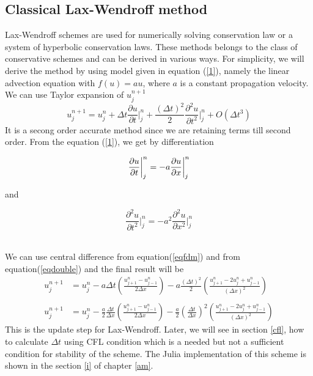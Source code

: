 \subsection{Classical Lax-Wendroff method}
Lax-Wendroff schemes are used for numerically solving conservation law or a system of hyperbolic conservation laws. These methods belongs to the class of conservative schemes and can be derived in various ways. For simplicity, we will derive the method by using model given in equation (\ref{1}), namely the linear advection equation with $f(u)=au$, where $a$ is a constant propagation velocity. We can use Taylor expansion of $u_j^{n+1}$
\begin{equation*}
    u_j^{n+1} = u_j^n + \Delta t \frac{\partial u}{\partial t}\bigg\vert_j^n + \frac{(\Delta t)^2}{2} \frac{\partial^2 u}{\partial t^2}\bigg\vert_j^n + O(\Delta t^3)
\end{equation*}
It is a secong order accurate method since we are retaining terms till second order. From the equation (\ref{1}), we get by differentiation\\
\begin{minipage}{0.5\textwidth}
\begin{equation*}
    \frac{\partial u}{\partial t}\bigg \vert_j^n = -a\frac{\partial u}{\partial x}\bigg \vert_j^n \\
\end{equation*}
\end{minipage} \hspace{-40pt} and \hspace{-40pt}
\begin{minipage}{0.5\textwidth}
\begin{equation*}
    \frac{\partial^2 u}{\partial t^2}\bigg \vert_j^n = -a^2\frac{\partial^2 u}{\partial x^2}\bigg \vert_j^n 
\end{equation*}
\end{minipage}\\
We can use central difference from equation(\ref{eqfdm}) and from equation(\ref{eqdouble}) and the final result will be
\begin{align*}
    u_j^{n+1} &= u_j^n - a\Delta t \left(\frac{u_{j+1}^n - u_{j-1}^n}{2\Delta x}\right) - a\frac{(\Delta t)^2}{2} \left(\frac{u_{j+1}^n - 2u_j^n + u_{j-1}^n}{(\Delta x)^2}\right)\\ \\
    u_j^{n+1} &= u_j^n -\frac{a}{2}\frac{\Delta t}{\Delta x}\left(\frac{u_{j+1}^n - u_{j-1}^n}{2\Delta x}\right) - \frac{a}{2}\left(\frac{\Delta t}{\Delta x}\right)^2 \left(\frac{u_{j+1}^n - 2u_j^n + u_{j-1}^n}{(\Delta x)^2}\right)
\end{align*}
This is the update step for Lax-Wendroff. Later, we will see in section \ref{cfl}, how to calculate $\Delta t$ using CFL condition which is a needed but not a sufficient condition for stability of the scheme. The {\ttfamily Julia} implementation of this scheme is shown in the section \ref{i} of chapter \ref{am}.
